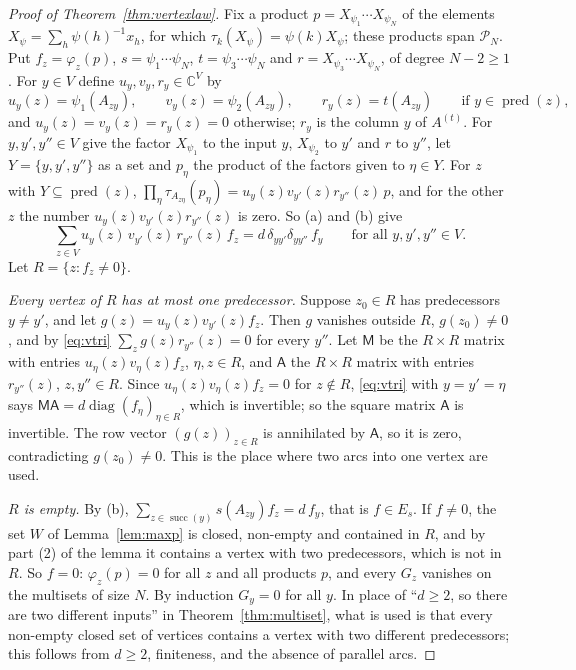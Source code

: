 \begin{proof}[Proof of Theorem~\ref{thm:vertexlaw}]
Fix a product $p=X_{\psi_1}\cdots X_{\psi_N}$ of the elements $X_\psi=\sum_h\psi(h)^{-1}x_h$, for which $\tau_k(X_\psi)=\psi(k)X_\psi$; these products span $\mathcal{P}_N$. Put $f_z=\varphi_z(p)$, $s=\psi_1\cdots\psi_N$, $t=\psi_3\cdots\psi_N$ and $r=X_{\psi_3}\cdots X_{\psi_N}$, of degree $N-2\ge1$. For $y\in V$ define $u_y,v_y,r_y\in\mathbb{C}^V$ by
\[
u_y(z)=\psi_1(A_{zy}),\qquad v_y(z)=\psi_2(A_{zy}),\qquad r_y(z)=t(A_{zy})\qquad\text{if }y\in\operatorname{pred}(z),
\]
and $u_y(z)=v_y(z)=r_y(z)=0$ otherwise; $r_y$ is the column $y$ of $A^{(t)}$. For $y,y',y''\in V$ give the factor $X_{\psi_1}$ to the input $y$, $X_{\psi_2}$ to $y'$ and $r$ to $y''$, let $Y=\{y,y',y''\}$ as a set and $p_\eta$ the product of the factors given to $\eta\in Y$. For $z$ with $Y\subseteq\operatorname{pred}(z)$, $\prod_\eta\tau_{A_{z\eta}}(p_\eta)=u_y(z)v_{y'}(z)r_{y''}(z)\,p$, and for the other $z$ the number $u_y(z)v_{y'}(z)r_{y''}(z)$ is zero. So (a) and (b) give
\begin{equation}\label{eq:vtri}
\sum_{z\in V}u_y(z)\,v_{y'}(z)\,r_{y''}(z)\,f_z=d\,\delta_{yy'}\delta_{yy''}\,f_y\qquad\text{for all }y,y',y''\in V.
\end{equation}
Let $R=\{z:f_z\ne0\}$.

\emph{Every vertex of $R$ has at most one predecessor.} Suppose $z_0\in R$ has predecessors $y\ne y'$, and let $g(z)=u_y(z)v_{y'}(z)f_z$. Then $g$ vanishes outside $R$, $g(z_0)\ne0$, and by \eqref{eq:vtri} $\sum_zg(z)r_{y''}(z)=0$ for every $y''$. Let $\mathsf{M}$ be the $R\times R$ matrix with entries $u_\eta(z)v_\eta(z)f_z$, $\eta,z\in R$, and $\mathsf{A}$ the $R\times R$ matrix with entries $r_{y''}(z)$, $z,y''\in R$. Since $u_\eta(z)v_\eta(z)f_z=0$ for $z\notin R$, \eqref{eq:vtri} with $y=y'=\eta$ says $\mathsf{M}\mathsf{A}=d\operatorname{diag}(f_\eta)_{\eta\in R}$, which is invertible; so the square matrix $\mathsf{A}$ is invertible. The row vector $(g(z))_{z\in R}$ is annihilated by $\mathsf{A}$, so it is zero, contradicting $g(z_0)\ne0$. This is the place where two arcs into one vertex are used.

\emph{$R$ is empty.} By (b), $\sum_{z\in\operatorname{succ}(y)}s(A_{zy})f_z=d\,f_y$, that is $f\in E_s$. If $f\ne0$, the set $W$ of Lemma~\ref{lem:maxp} is closed, non-empty and contained in $R$, and by part (2) of the lemma it contains a vertex with two predecessors, which is not in $R$. So $f=0$: $\varphi_z(p)=0$ for all $z$ and all products $p$, and every $G_z$ vanishes on the multisets of size $N$. By induction $G_y=0$ for all $y$. In place of ``$d\ge2$, so there are two different inputs'' in Theorem~\ref{thm:multiset}, what is used is that every non-empty closed set of vertices contains a vertex with two different predecessors; this follows from $d\ge2$, finiteness, and the absence of parallel arcs.


\end{proof}
